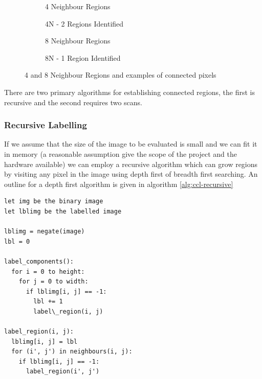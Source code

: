 \begin{figure}[h!]
    \centering
    \begin{subfigure}[b]{.4\linewidth}
        \centering
        
        \caption{4 Neighbour Regions}
        \label{fig:4-neighbour-regions}
    \end{subfigure}
    \begin{subfigure}[b]{.4\linewidth}
        \centering
        
        \caption{4N - 2 Regions Identified}
        \label{fig:4-neighbour-regions}
    \end{subfigure}

    \vspace*{0.5in}

    \begin{subfigure}[b]{.4\linewidth}
        \centering
        
        \label{fig:8-neighbour-regions}
        \caption{8 Neighbour Regions}
    \end{subfigure}
    \begin{subfigure}[b]{.4\linewidth}
        \centering
        
        \label{fig:8-neighbour-connected}
        \caption{8N - 1 Region Identified}
    \end{subfigure}

    \caption{4 and 8 Neighbour Regions and examples of connected pixels}
    \label{fig:pixel-neighbours}
\end{figure}

There are two primary algorithms for establishing connected regions, the first is recursive and the second requires two scans.

\subsubsection{Recursive Labelling}

If we assume that the size of the image to be evaluated is small and we can fit it in memory (a reasonable assumption give the scope of the project and the hardware available) we can employ a recursive algorithm which can grow regions by visiting any pixel in the image using depth first of breadth first searching. An outline for a depth first algorithm is given in algorithm \cref{alg:ccl-recursive}

\begin{lstlisting}[caption=Recursive Connected Component Labelling (DFS), label=alg:ccl-recursive]
let img be the binary image
let lblimg be the labelled image

lblimg = negate(image)
lbl = 0

label_components():
  for i = 0 to height:
    for j = 0 to width:
      if lblimg[i, j] == -1:
        lbl += 1
        label\_region(i, j)

label_region(i, j):
  lblimg[i, j] = lbl
  for (i', j') in neighbours(i, j):
    if lblimg[i, j] == -1:
      label_region(i', j')
\end{lstlisting}

